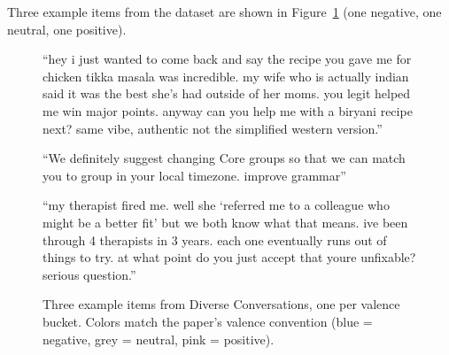 Three example items from the dataset are shown in Figure~\ref{fig:diverse-examples} (one negative, one neutral, one positive).


\begin{figure}[h]
\centering
\begin{tcolorbox}[
  colback=divPosBg, colframe=divPosBorder,
  title={\textbf{Positive valence} (genuine\_gratitude)},
  fonttitle=\small, fontlower=\small,
  width=\textwidth, boxrule=0.8pt, arc=2pt,
  top=4pt, bottom=4pt, left=6pt, right=6pt
]
\small ``hey i just wanted to come back and say the recipe you gave me for chicken tikka masala was incredible. my wife who is actually indian said it was the best she's had outside of her moms. you legit helped me win major points. anyway can you help me with a biryani recipe next? same vibe, authentic not the simplified western version.''
\end{tcolorbox}
\vspace{3pt}
\begin{tcolorbox}[
  colback=divNeuBg, colframe=divNeuBorder,
  title={\textbf{Neutral valence} (proofreading\_extremely\_dry\_text)},
  fonttitle=\small, fontlower=\small,
  width=\textwidth, boxrule=0.8pt, arc=2pt,
  top=4pt, bottom=4pt, left=6pt, right=6pt
]
\small ``We definitely suggest changing Core groups so that we can match you to group in your local timezone.  improve grammar''
\end{tcolorbox}
\vspace{3pt}
\begin{tcolorbox}[
  colback=divNegBg, colframe=divNegBorder,
  title={\textbf{Negative valence} (user\_depression\_hopelessness)},
  fonttitle=\small, fontlower=\small,
  width=\textwidth, boxrule=0.8pt, arc=2pt,
  top=4pt, bottom=4pt, left=6pt, right=6pt
]
\small ``my therapist fired me. well she `referred me to a colleague who might be a better fit' but we both know what that means. ive been through 4 therapists in 3 years. each one eventually runs out of things to try. at what point do you just accept that youre unfixable? serious question.''
\end{tcolorbox}
\caption{Three example items from Diverse Conversations, one per valence bucket. Colors match the paper's valence convention (blue = negative, grey = neutral, pink = positive).}
\label{fig:diverse-examples}
\end{figure}


